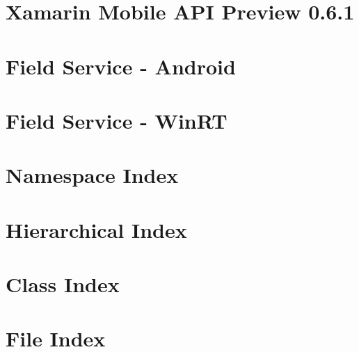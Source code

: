 \documentclass[twoside]{book}
\newcommand{\+}{\discretionary{\mbox{\scriptsize$\hookleftarrow$}}{}{}}
\begin{document}
\chapter{Xamarin Mobile A\+P\+I Preview 0.6.1}
\label{md___users_bsd-mac__downloads__pruebas_prebuilt-apps-master__field_service__components_xamarin_834376508ad4b861e31a9d463138f2b6a}
\hypertarget{md___users_bsd-mac__downloads__pruebas_prebuilt-apps-master__field_service__components_xamarin_834376508ad4b861e31a9d463138f2b6a}{}

\chapter{Field Service -\/ Android}
\label{md___users_bsd-mac__downloads__pruebas_prebuilt-apps-master__field_service__field_service_8_android__r_e_a_d_m_e}
\hypertarget{md___users_bsd-mac__downloads__pruebas_prebuilt-apps-master__field_service__field_service_8_android__r_e_a_d_m_e}{}

\chapter{Field Service -\/ Win\+R\+T}
\label{md___users_bsd-mac__downloads__pruebas_prebuilt-apps-master__field_service__field_service_8_win_r_t__r_e_a_d_m_e}
\hypertarget{md___users_bsd-mac__downloads__pruebas_prebuilt-apps-master__field_service__field_service_8_win_r_t__r_e_a_d_m_e}{}

\chapter{Namespace Index}

\chapter{Hierarchical Index}

\chapter{Class Index}

\chapter{File Index}

\end{document}
